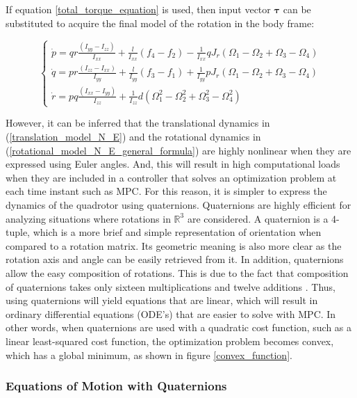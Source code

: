 \documentclass{thesisreport}
\begin{document}
If equation \ref{total_torque_equation} is used, then input vector $\bm{\tau}$ can be substituted to acquire the final model of the rotation in the body frame:

\begin{equation}
\begin{cases}
\dot{p} = qr \frac{(I_{yy}-I_{zz})}{I_{xx}} + \frac{l}{I_{xx}}(f_4-f_2) - \frac{1}{I_{xx}}qJ_r (\Omega_1 - \Omega_2 + \Omega_3 - \Omega_4) \\
\dot{q} = pr \frac{(I_{zz}-I_{xx})}{I_{yy}} + \frac{l}{I_{yy}}(f_3-f_1) + \frac{1}{I_{yy}}pJ_r (\Omega_1 - \Omega_2 + \Omega_3 - \Omega_4) \\
\dot{r} = pq \frac{(I_{xx}-I_{yy})}{I_{zz}} + \frac{1}{I_{zz}} d (\Omega_1^2 -\Omega_2^2 + \Omega_3^2 - \Omega_4^2)
\end{cases}
\end{equation}

However, it can be inferred that the translational dynamics in  (\ref{translation_model_N_E}) and the rotational dynamics in (\ref{rotational_model_N_E_general_formula}) are highly nonlinear when they are expressed using Euler angles. And, this will result in high computational loads when they are included in a controller that solves an optimization problem at each time instant such as MPC. For this reason, it is simpler to express the dynamics of the quadrotor using quaternions. Quaternions are highly efficient for analyzing situations where rotations in $\mathbb{R}^3$ are considered. A quaternion is a 4-tuple, which is a more brief and simple representation of orientation when compared to a rotation matrix. Its geometric meaning is also more clear as the rotation axis and angle can be easily retrieved from it. In addition, quaternions allow the easy composition of rotations. This is due to the fact that composition of quaternions takes only sixteen multiplications and twelve additions \cite{jia_2013}. Thus, using quaternions will yield equations that are linear, which will result in ordinary differential equations (ODE's) that are easier to solve with MPC. In other words, when quaternions are used with a quadratic cost function, such as a linear least-squared cost function, the optimization problem becomes convex, which has a global minimum, as shown in figure \ref{convex_function}.

\newpage

\subsubsection{Equations of Motion with Quaternions}
\end{document}
